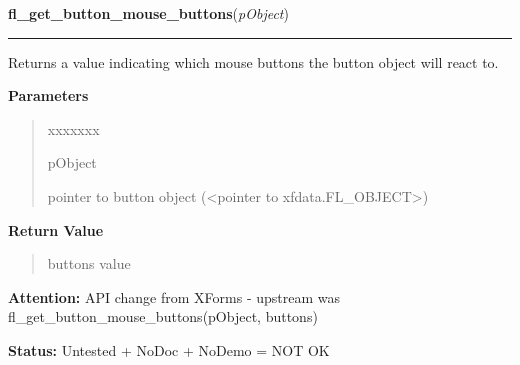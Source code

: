 \hspace{.8\funcindent}\begin{boxedminipage}{\funcwidth}

    \raggedright \textbf{fl\_get\_button\_mouse\_buttons}(\textit{pObject})

    \vspace{-1.5ex}

    \rule{\textwidth}{0.5\fboxrule}
\setlength{\parskip}{2ex}
    Returns a value indicating which mouse buttons the button object will 
    react to.

\setlength{\parskip}{1ex}
      \textbf{Parameters}
      \vspace{-1ex}

      \begin{quote}
        \begin{Ventry}{xxxxxxx}

          \item[pObject]

          pointer to button object ({\textless}pointer to 
          xfdata.FL\_OBJECT{\textgreater})

        \end{Ventry}

      \end{quote}

      \textbf{Return Value}
    \vspace{-1ex}

      \begin{quote}
      buttons value

      \end{quote}

\textbf{Attention:} API change from XForms - upstream was 
fl\_get\_button\_mouse\_buttons(pObject, buttons)



\textbf{Status:} Untested + NoDoc + NoDemo = NOT OK



    \end{boxedminipage}

    \label{xformslib:library:fl_create_generic_canvas}

    \vspace{0.5ex}

